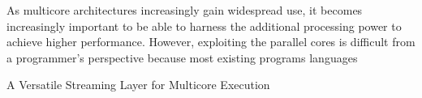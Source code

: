 %
%
%
% 
% 
%

As multicore architectures increasingly gain widespread use, it becomes increasingly important to be able to harness the
additional processing power to achieve higher performance. However, exploiting the parallel cores is difficult from a
programmer's perspective because most existing programs languages 

A Versatile Streaming Layer for Multicore Execution 



